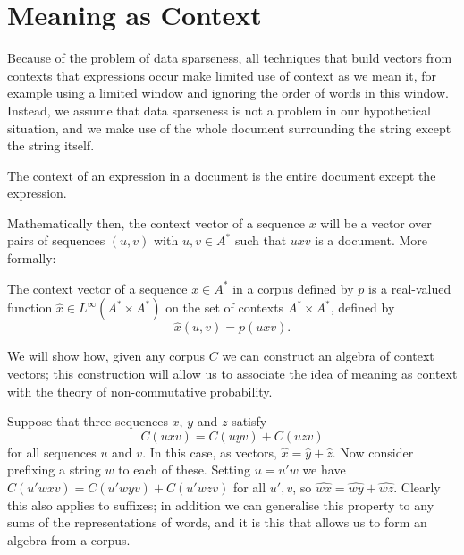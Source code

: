 \documentclass[11pt]{report}
\begin{document}
\section{Meaning as Context}


 Because of the problem of data sparseness, all techniques that build vectors from contexts that expressions occur make limited use of context as we mean it, for example using a limited window and ignoring the order of words in this window. Instead, we assume that data sparseness is not a problem in our hypothetical situation, and we make use of the whole document surrounding the string except the string itself. 


\begin{assumption} The context of an expression in a document is the entire document except the expression.\end{assumption} \noindent
Mathematically then, the context vector of a sequence $x$ will be a vector over pairs of sequences $(u,v)$ with $u,v \in A^*$ such that $uxv$ is a document. More formally:
\begin{defn}
The context vector of a sequence $x \in A^*$ in a corpus defined by $p$ is a real-valued function $\hat{x}\in L^\infty(A^*\times A^*)$  on the set of contexts $A^* \times A^*$, defined by
$$\hat{x}(u,v) = p(uxv).$$
\end{defn}



We will show how, given any corpus $C$ we can construct an algebra of context vectors; this construction will allow us to associate the idea of meaning as context with the theory of non-commutative probability.

Suppose that three sequences $x$, $y$ and $z$ satisfy
$$C(uxv) = C(uyv) + C(uzv)$$
for all sequences $u$ and $v$. In this case, as vectors, $\hat{x} = \hat{y} + \hat{z}$. Now consider prefixing a string $w$ to each of these. Setting $u = u'w$ we have $C(u'wxv) = C(u'wyv) + C(u'wzv)$ for all $u',v$, so $\widehat{wx} = \widehat{wy} + \widehat{wz}$. Clearly this also applies to suffixes; in addition we can generalise this property to any sums of the representations of words, and it is this that allows us to form an algebra from a corpus.
\end{document}
